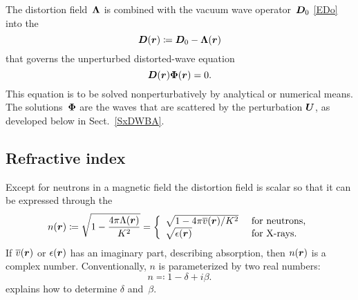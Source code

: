 The distortion field~$\bm{\Lambda}$ is combined
with the vacuum wave operator~$\bm{D}_0$ \cref{EDo}
into the 
%
%
%
\begin{equation}\label{EdefD}
  \TD(\r) \coloneqq \TDo - \TL(\r)
\end{equation}
that governs the unperturbed distorted-wave equation
%
%
%
\begin{equation}\label{EDPsi0}
  \TD(\r)\v\Phi(\r) = 0.
\end{equation}
This equation is to be solved nonperturbatively by analytical or numerical means.
The solutions~$\bm{\Phi}$ are the  waves
%
%
that are scattered by the perturbation $\bm{U}$,
as developed below in Sect.~\ref{SxDWBA}.

\subsection{Refractive index}\label{Sri1}

Except for neutrons in a magnetic field
the distortion field is scalar so
that it can be expressed through the 
%
%
%
\begin{equation}\label{EnkK}
  n(\r)
  \coloneqq\sqrt{1-\frac{4\pi\Lambda(\r)}{K^2}}
  = \left\{\begin{array}{ll}
       \sqrt{1-4\pi\mv(\r)/K^2} &\text{ for neutrons,}\\
       \sqrt{\epsilon(\r)} &\text{ for X-rays.}
    \end{array}\right.
\end{equation}
If $\overline{v}(\bm{r})$ or $\epsilon(\bm{r})$ has an imaginary part, describing absorption,
%
then $n(\bm{r})$ is a complex number.
Conventionally, $n$ is parameterized by two real numbers:
\begin{equation}\label{Endb1}
  n \eqqcolon  1-\delta +i\beta.
\end{equation}
%
%
 explains how to determine $\delta$ and~$\beta$.

